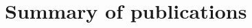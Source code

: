 

\newpage
\section{Summary of publications}
\newcommand{\fcite}[1]{
  \begin{leftbar}
  \begin{quote}%
    \citep{#1} \fullcite{#1}
  \end{quote}
  \end{leftbar}}

